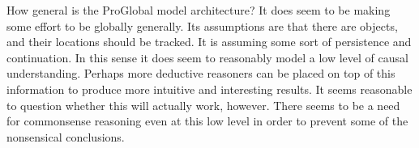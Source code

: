 \documentclass[11pt,a4paper]{article}
\begin{document}
How general is the ProGlobal model architecture? It does seem to be making some effort to be globally generally. Its assumptions are that there are objects, and their locations should be tracked. It is assuming some sort of persistence and continuation. In this sense it does seem to reasonably model a low level of causal understanding. Perhaps more deductive reasoners can be placed on top of this information to produce more intuitive and interesting results. It seems reasonable to question whether this will actually work, however. There seems to be a need for commonsense reasoning even at this low level in order to prevent some of the nonsensical conclusions.



\end{document}
